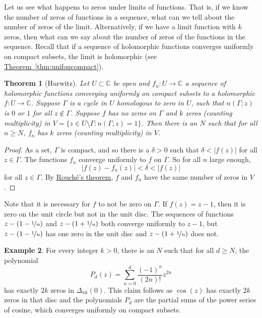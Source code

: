 \documentclass[12pt,openany]{book}
\newcommand{\sabs}[1]{\lvert {#1} \rvert}
\newcommand{\C}{{\mathbb{C}}}
\theoremstyle{plain}
\newtheorem{thm}{Theorem}[section]
\theoremstyle{remark}
\theoremstyle{definition}
\theoremstyle{exercise}
\theoremstyle{example}
\newtheorem{example}[thm]{Example}
\newcommand{\thmref}[1]{\hyperref[#1]{Theorem~\ref*{#1}}}
\begin{document}
Let us see what happens to zeros under limits of functions.
That is, if we know the number of zeros of functions in a sequence,
what can we tell about the number of zeros of the limit.  Alternatively,
if we have a limit function with $k$ zeros, then what can
we say about the number of zeros of the functions in the sequence.
Recall that if a sequence of holomorphic
functions converges uniformly on compact subsets, the limit is holomorphic
(see \thmref{thm:unifoncompact}).

\begin{thm}[Hurwitz]
Let $U \subset \C$ be open and $f_n \colon U \to \C$ a sequence of
holomorphic functions converging uniformly on compact subsets
to a holomorphic $f \colon U \to \C$.  Suppose $\Gamma$ is
a cycle in $U$ homologous to zero in $U$,
such that $n(\Gamma;z)$ is $0$ or $1$ for all $z \notin \Gamma$.
Suppose $f$ has no zeros on $\Gamma$ and $k$ zeros (counting
multiplicity) in $V = \bigl\{ z \in U \setminus \Gamma : n(\Gamma;z) = 1 \bigr\}$.
Then there is an $N$ such that for all $n \geq N$,
$f_n$ has $k$ zeros (counting multiplicity) in $V$.
\end{thm}

\begin{proof}
As a set, $\Gamma$ is compact, and so
there is a $\delta > 0$ such that $\delta < \sabs{f(z)}$
for all $z \in \Gamma$.
The functions $f_n$
converge uniformly to $f$ on $\Gamma$.
So for all $n$ large enough,
\begin{equation*}
\sabs{f(z)-f_n(z)} < \delta < \sabs{f(z)}
\end{equation*}
for all $z \in \Gamma$.  By \hyperref[thm:rouche2]{Rouch\'e's theorem},
$f$ and $f_n$ have the same number of zeros in $V$.
\end{proof}

Note that it is necessary for $f$
to not be zero on $\Gamma$.  If $f(z) = z-1$, then it is zero on
the unit circle but not in the unit disc.
The sequences of functions $z-(1-\nicefrac{1}{n})$ and 
$z-(1+\nicefrac{1}{n})$ both converge uniformly to $z-1$, but
$z-(1-\nicefrac{1}{n})$ has one zero in the unit disc
and $z-(1+\nicefrac{1}{n})$ does not.

\begin{example}
For every integer $k > 0$, there is an $N$ such that
for all $d \geq N$,
the polynomial
\begin{equation*}
P_d(z) = \sum_{n=0}^d \frac{{(-1)}^n}{(2n)!}z^{2n}
\end{equation*}
has exactly $2k$ zeros in $\Delta_{\pi k}(0)$.
This claim follows as $\cos(z)$ has exactly $2k$ zeros in that disc
and the polynomials $P_d$ are the partial sums of the power series of
cosine, which converges uniformly on compact subsets.
\end{example}
  
\end{document}
